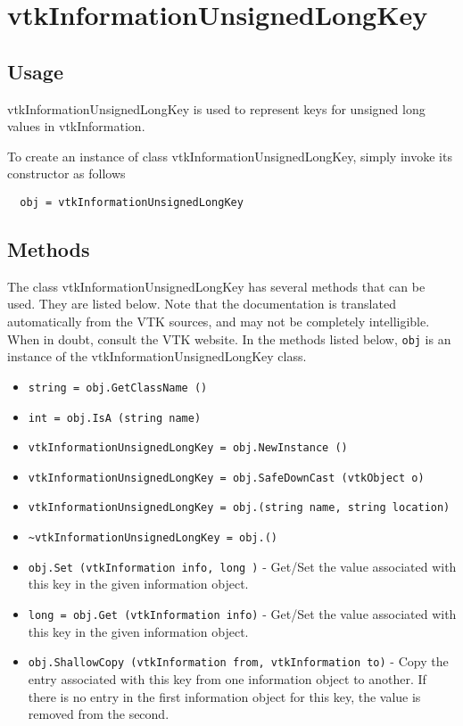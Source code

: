 \section{vtkInformationUnsignedLongKey}

\subsection{Usage}

 vtkInformationUnsignedLongKey is used to represent keys for unsigned long values
 in vtkInformation.

To create an instance of class vtkInformationUnsignedLongKey, simply
invoke its constructor as follows
\begin{verbatim}
  obj = vtkInformationUnsignedLongKey
\end{verbatim}
\subsection{Methods}

The class vtkInformationUnsignedLongKey has several methods that can be used.
  They are listed below.
Note that the documentation is translated automatically from the VTK sources,
and may not be completely intelligible.  When in doubt, consult the VTK website.
In the methods listed below, \verb|obj| is an instance of the vtkInformationUnsignedLongKey class.
\begin{itemize}
\item  \verb|string = obj.GetClassName ()|

\item  \verb|int = obj.IsA (string name)|

\item  \verb|vtkInformationUnsignedLongKey = obj.NewInstance ()|

\item  \verb|vtkInformationUnsignedLongKey = obj.SafeDownCast (vtkObject o)|

\item  \verb|vtkInformationUnsignedLongKey = obj.(string name, string location)|

\item  \verb|~vtkInformationUnsignedLongKey = obj.()|

\item  \verb|obj.Set (vtkInformation info, long )| -  Get/Set the value associated with this key in the given
 information object.

\item  \verb|long = obj.Get (vtkInformation info)| -  Get/Set the value associated with this key in the given
 information object.

\item  \verb|obj.ShallowCopy (vtkInformation from, vtkInformation to)| -  Copy the entry associated with this key from one information
 object to another.  If there is no entry in the first information
 object for this key, the value is removed from the second.

\end{itemize}
